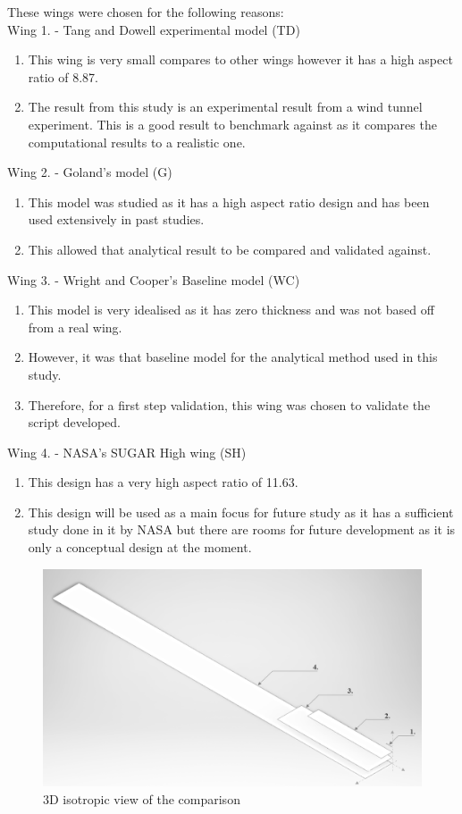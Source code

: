 \documentclass[11pt]{article}
\begin{document}
These wings were chosen for the following reasons:\\
Wing 1. - Tang and Dowell experimental model \cite{Tang2001ExperimentalWings} (TD)
\begin{enumerate}
    \item This wing is very small compares to other wings however it has a high aspect ratio of 8.87.
    \item The result from this study is an experimental result from a wind tunnel experiment. This is a good result to benchmark against as it compares the computational results to a realistic one.
\end{enumerate}
Wing 2. - Goland's model \cite{Goland1949AWings} (G)
\begin{enumerate}
    \item This model was studied as it has a high aspect ratio design and has been used extensively in past studies.
    \item This allowed that analytical result to be compared and validated against.
\end{enumerate}
Wing 3. - Wright and Cooper's Baseline model \cite{Wright2015INTRODUCTIONLOADS} (WC)
\begin{enumerate}
    \item This model is very idealised as it has zero thickness and was not based off from a real wing.
    \item However, it was that baseline model for the analytical method used in this study.
    \item Therefore, for a first step validation, this wing was chosen to validate the script developed.
\end{enumerate}
Wing 4. - NASA's SUGAR High wing \cite{Bradley2015SubsonicExploration} (SH)
\begin{enumerate}
    \item This design has a very high aspect ratio of 11.63.
    \item This design will be used as a main focus for future study as it has a sufficient study done in it by NASA but there are rooms for future development as it is only a conceptual design at the moment.
\end{enumerate}
\begin{figure}[H]
    \centering
    \includegraphics[width=.8\textwidth]{figures/iso-view.png}
    \caption{3D isotropic view of the comparison}
    \label{fig:3D-wings}
\end{figure}
\end{document}
